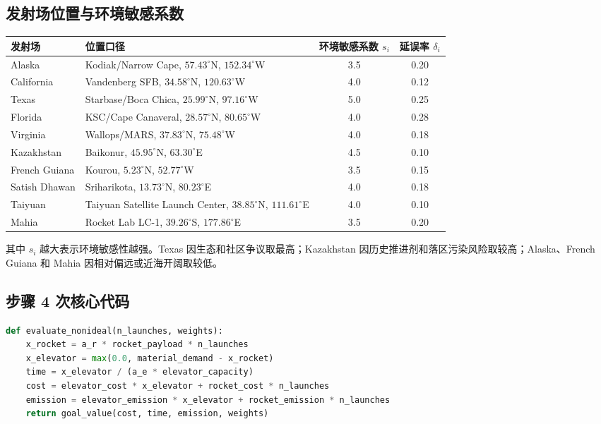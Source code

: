 \documentclass[12pt,a4paper,UTF8]{article}
\begin{document}
\subsection{发射场位置与环境敏感系数}
\label{app:sites}

\begin{center}
\footnotesize
\renewcommand{\arraystretch}{1.18}
\begin{tabular}{p{}p{}cc}
\toprule
发射场 & 位置口径 & 环境敏感系数 \(s_i\) & 延误率 \(\delta_i\) \\
\midrule
Alaska & Kodiak/Narrow Cape, \(57.43^\circ\)N, \(152.34^\circ\)W & 3.5 & 0.20 \\
California & Vandenberg SFB, \(34.58^\circ\)N, \(120.63^\circ\)W & 4.0 & 0.12 \\
Texas & Starbase/Boca Chica, \(25.99^\circ\)N, \(97.16^\circ\)W & 5.0 & 0.25 \\
Florida & KSC/Cape Canaveral, \(28.57^\circ\)N, \(80.65^\circ\)W & 4.0 & 0.28 \\
Virginia & Wallops/MARS, \(37.83^\circ\)N, \(75.48^\circ\)W & 4.0 & 0.18 \\
Kazakhstan & Baikonur, \(45.95^\circ\)N, \(63.30^\circ\)E & 4.5 & 0.10 \\
French Guiana & Kourou, \(5.23^\circ\)N, \(52.77^\circ\)W & 3.5 & 0.15 \\
Satish Dhawan & Sriharikota, \(13.73^\circ\)N, \(80.23^\circ\)E & 4.0 & 0.18 \\
Taiyuan & Taiyuan Satellite Launch Center, \(38.85^\circ\)N, \(111.61^\circ\)E & 4.0 & 0.10 \\
Mahia & Rocket Lab LC-1, \(39.26^\circ\)S, \(177.86^\circ\)E & 3.5 & 0.20 \\
\bottomrule
\end{tabular}
\end{center}

其中 \(s_i\) 越大表示环境敏感性越强。Texas 因生态和社区争议取最高；Kazakhstan 因历史推进剂和落区污染风险取较高；Alaska、French Guiana 和 Mahia 因相对偏远或近海开阔取较低。

\subsection{步骤 4 次核心代码}
\label{app:code-nonideal}

\begin{lstlisting}[language=Python]
def evaluate_nonideal(n_launches, weights):
    x_rocket = a_r * rocket_payload * n_launches
    x_elevator = max(0.0, material_demand - x_rocket)
    time = x_elevator / (a_e * elevator_capacity)
    cost = elevator_cost * x_elevator + rocket_cost * n_launches
    emission = elevator_emission * x_elevator + rocket_emission * n_launches
    return goal_value(cost, time, emission, weights)
\end{lstlisting}
\end{document}
